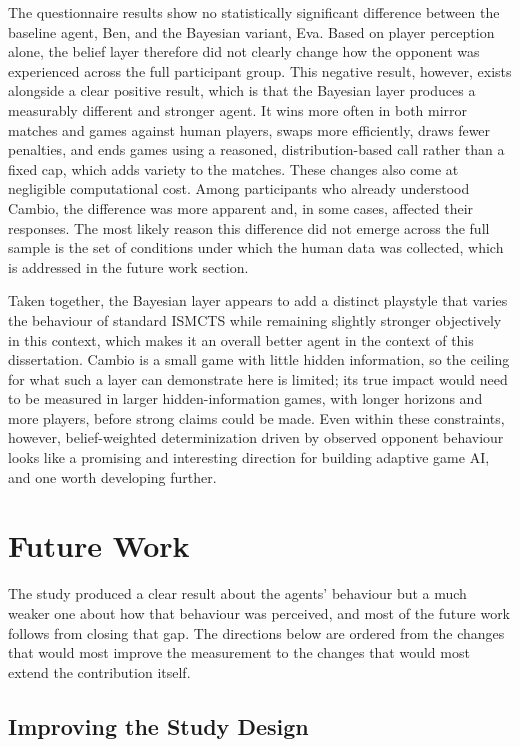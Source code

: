 \documentclass[12pt,a4paper,oneside]{report}
\begin{document}
The questionnaire results show no statistically significant difference between the baseline agent, Ben, and the Bayesian variant, Eva. Based on player perception alone, the belief layer therefore did not clearly change how the opponent was experienced across the full participant group. This negative result, however, exists alongside a clear positive result, which is that the Bayesian layer produces a measurably different and stronger agent. It wins more often in both mirror matches and games against human players, swaps more efficiently, draws fewer penalties, and ends games using a reasoned, distribution-based call rather than a fixed cap, which adds variety to the matches. These changes also come at negligible computational cost. Among participants who already understood Cambio, the difference was more apparent and, in some cases, affected their responses. The most likely reason this difference did not emerge across the full sample is the set of conditions under which the human data was collected, which is addressed in the future work section.

Taken together, the Bayesian layer appears to add a distinct playstyle that varies the
behaviour of standard ISMCTS while remaining slightly stronger objectively in this
context, which makes it an overall better agent in the context of this dissertation. Cambio is a small game with little hidden information, so the ceiling for what such a layer can demonstrate here is limited; its true impact would need to be measured
in larger hidden-information games, with longer horizons and more players, before strong
claims could be made. Even within these constraints, however, belief-weighted
determinization driven by observed opponent behaviour looks like a promising and
 interesting direction for building adaptive game AI, and one worth developing
further.


\section{Future Work}

The study produced a clear result about the agents' behaviour but a much weaker one about
how that behaviour was perceived, and most of the future work follows from closing that
gap. The directions below are ordered from the changes that would most improve the
measurement to the changes that would most extend the contribution itself.

\subsection{Improving the Study Design}
\end{document}
